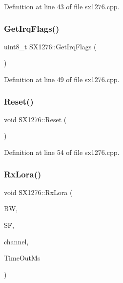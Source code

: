 Definition at line 43 of file sx1276.\+cpp.

\mbox{\label{class_s_x1276_a993418a10ee158597c183324c6328f02}} 
\subsubsection{\texorpdfstring{Get\+Irq\+Flags()}{GetIrqFlags()}}
{\footnotesize\ttfamily uint8\+\_\+t S\+X1276\+::\+Get\+Irq\+Flags (\begin{DoxyParamCaption}\item[{void}]{ }\end{DoxyParamCaption})}



Definition at line 49 of file sx1276.\+cpp.

\mbox{\label{class_s_x1276_a279a0411958926be3b67e42bd5d0bf5c}} 
\subsubsection{\texorpdfstring{Reset()}{Reset()}}
{\footnotesize\ttfamily void S\+X1276\+::\+Reset (\begin{DoxyParamCaption}\item[{void}]{ }\end{DoxyParamCaption})}



Definition at line 54 of file sx1276.\+cpp.

\mbox{\label{class_s_x1276_a53de2b0fe1c40753e82279518ccd1992}} 
\subsubsection{\texorpdfstring{Rx\+Lora()}{RxLora()}}
{\footnotesize\ttfamily void S\+X1276\+::\+Rx\+Lora (\begin{DoxyParamCaption}\item[{\mbox{\hyperlink{_define_8h_a6cbb491180e131f374cdbe63880c85e1}{e\+Band\+Width}}}]{BW,  }\item[{uint8\+\_\+t}]{SF,  }\item[{uint32\+\_\+t}]{channel,  }\item[{uint16\+\_\+t}]{Time\+Out\+Ms }\end{DoxyParamCaption})}



